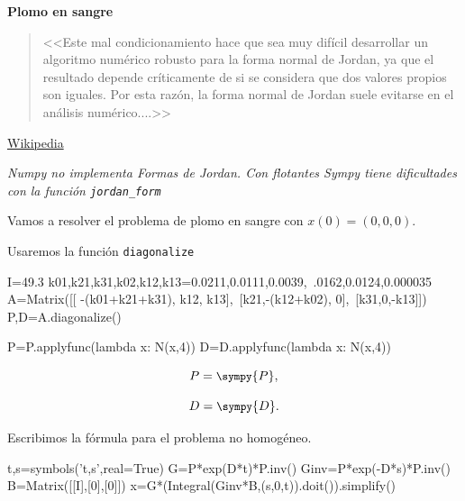 \begin{ejemplo}{}\textbf{Plomo en sangre}
  
 \begin{quote}
<<Este mal condicionamiento hace que sea muy difícil desarrollar un 
algoritmo numérico robusto para la forma normal de Jordan, 
ya que el resultado depende críticamente de si se considera 
que dos valores propios son iguales. 
Por esta razón, la forma normal de Jordan suele evitarse 
en el análisis numérico....>>
 \end{quote}
 
  \begin{flushright}
   \href{https://en.wikipedia.org/wiki/Jordan_normal_form}{Wikipedia}
  \end{flushright}

\emph{Numpy no implementa Formas de Jordan. 
Con flotantes Sympy tiene dificultades con la función 
\texttt{jordan\_form} }
  
 
 
 
Vamos a resolver el problema de plomo en sangre con $x(0)=(0,0,0)$.

Usaremos la función  \texttt{diagonalize} 
  

\begin{sympyblock}[][numbers=left,frame=single,framesep=5mm]
I=49.3
k01,k21,k31,k02,k12,k13=0.0211,0.0111,0.0039,\
    .0162,0.0124,0.000035 
A=Matrix([[ -(k01+k21+k31), k12, k13],\
    [k21,-(k12+k02), 0],\
    [k31,0,-k13]])
P,D=A.diagonalize()
\end{sympyblock}

\begin{sympycode}
P=P.applyfunc(lambda x: N(x,4))
D=D.applyfunc(lambda x: N(x,4))
\end{sympycode}



 $$\small P=\sympy{P},$$
 
 $$\small D=\sympy{D}.$$
 
 
 
Escribimos la fórmula para el problema no homogéneo.

\begin{sympyblock}[][numbers=left,frame=single,framesep=5mm]
t,s=symbols('t,s',real=True)
G=P*exp(D*t)*P.inv()
Ginv=P*exp(-D*s)*P.inv()
B=Matrix([[I],[0],[0]])
x=G*(Integral(Ginv*B,(s,0,t)).doit()).simplify()
\end{sympyblock}
 




\end{ejemplo}
